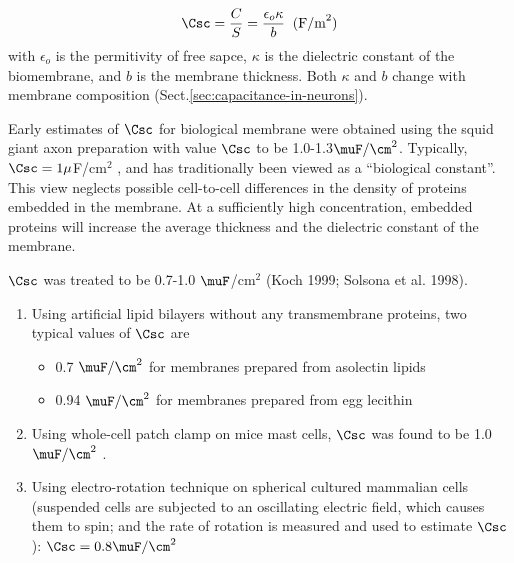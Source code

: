\begin{equation} 
\Csc = \frac{C}{S} = \frac{\epsilon_o \kappa}{b} \;\;(\text{F/m}^2)
\end{equation}
with $\epsilon_o$ is the permitivity of free sapce, $\kappa$ is the
dielectric constant of the biomembrane, and $b$ is the membrane thickness. Both
$\kappa$ and $b$ change with membrane composition (Sect.\ref{sec:capacitance-in-neurons}).

Early estimates of $\Csc$ for biological membrane were obtained using the squid
giant axon preparation with value $\Csc$ to be 1.0-1.3$\muF/\cm^2$. Typically,
$\Csc=1\mu$F/cm$^2$ \citep{cole1968, weidmann1970ect}, and  has traditionally
been viewed as a ``biological constant''. This view neglects possible
cell-to-cell differences in the density of proteins embedded in the membrane.
At a sufficiently high concentration, embedded proteins will increase the
average thickness and the dielectric constant of the membrane.

$\Csc$ was treated to be 0.7-1.0 $\muF$/cm$^2$ (Koch 1999; Solsona et al. 1998). 
\begin{enumerate}
  \item Using artificial lipid bilayers without any transmembrane proteins, two
  typical values of $\Csc$ are  \citep{niles1988}
\begin{itemize}
  \item 0.7 $\muF/\cm^2$ for membranes prepared from asolectin lipids
  \item 0.94 $\muF/\cm^2$ for membranes prepared from egg lecithin
\end{itemize}

  \item Using whole-cell patch clamp on mice mast cells, $\Csc$ was
found to be 1.0 $\muF/\cm^2$ \citep{solsona1998}. 

  \item Using electro-rotation technique on spherical cultured mammalian cells
  (suspended cells are subjected to an oscillating electric field, which causes
  them to spin; and the rate of rotation is measured and used to estimate $\Csc$): 
  $\Csc = 0.8 \muF/\cm^2$ \citep{sukhorukov1993}
\end{enumerate}

